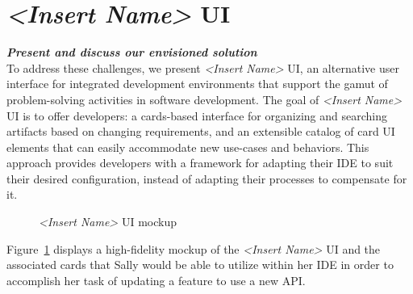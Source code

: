 \documentclass{ppig}
\newcommand{\nameUI}{\textit{<Insert Name>} UI}
\newcommand{\bold}[1]{\textit{\textbf{\color{aoblue}#1}}}
\begin{document}
\section{\nameUI{}}
\bold{Present and discuss our envisioned solution\\}
To address these challenges, we present \nameUI{}, an alternative user interface for integrated development environments that support the gamut of problem-solving activities in software development.
The goal of \nameUI{} is to offer developers: a cards-based interface for organizing and searching artifacts based on changing requirements, and an extensible catalog of card UI elements that can easily accommodate new use-cases and behaviors.
This approach provides developers with a framework for adapting their IDE to suit their desired configuration, instead of adapting their processes to compensate for it.
\begin{figure}[h!]
	\caption{\nameUI{} mockup}
	\label{mockup}
	\vspace*{-1.5\baselineskip}
\end{figure}

Figure~\ref{mockup} displays a high-fidelity mockup of the \nameUI{} and the associated cards that Sally would be able to utilize within her IDE in order to accomplish her task of updating a feature to use a new API.
\end{document}
